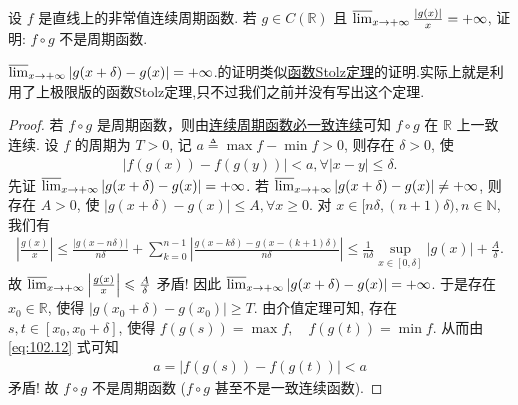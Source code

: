 \documentclass[../../main.tex]{subfiles}
\begin{document}
\begin{example}
设 $f$ 是直线上的非常值连续周期函数. 若 $g \in C(\mathbb{R})$ 且 $\varlimsup_{x \to +\infty} \frac{|g(x)|}{x} = +\infty$, 证明: $f \circ g$ 不是周期函数.
\end{example}
\begin{note}
$\varlimsup_{x \to +\infty} |g(x + \delta) - g(x)| = +\infty$.的证明类似\hyperref[theorem:函数Stolz定理]{函数Stolz定理}的证明.实际上就是利用了上极限版的函数Stolz定理,只不过我们之前并没有写出这个定理.
\end{note}
\begin{proof}
若 $f \circ g$ 是周期函数，则由\hyperref[proposition:连续周期函数必一致连续]{连续周期函数必一致连续}可知 $f \circ g$ 在 $\mathbb{R}$ 上一致连续.
设 $f$ 的周期为 $T > 0$, 记 $a \triangleq \max f - \min f > 0$, 则存在 $\delta > 0$, 使
\begin{align}
|f(g(x)) - f(g(y))| < a, \forall |x - y| \leqslant \delta. \label{eq:102.12}
\end{align}
先证 $\varlimsup_{x \to +\infty} |g(x + \delta) - g(x)| = +\infty$. 若 $\varlimsup_{x \to +\infty} |g(x + \delta) - g(x)| \ne +\infty$, 则存在 $A > 0$, 使
$|g(x + \delta) - g(x)| \leqslant A, \forall x \geqslant 0.$
对 $x \in [n\delta, (n + 1)\delta), n \in \mathbb{N}$, 我们有
\begin{align*}
\left| \frac{g(x)}{x} \right| \leqslant \frac{|g(x - n\delta)|}{n\delta} + \sum_{k=0}^{n - 1} \left| \frac{g(x - k\delta) - g(x - (k + 1)\delta)}{n\delta} \right| \leqslant \frac{1}{n\delta} \sup_{x \in [0, \delta]} |g(x)| + \frac{A}{\delta}.
\end{align*}
故 $\varlimsup_{x \to +\infty} \left| \frac{g(x)}{x} \right| \leqslant \frac{A}{\delta}$ 矛盾! 因此 $\varlimsup_{x \to +\infty} |g(x + \delta) - g(x)| = +\infty$.
于是存在 $x_0 \in \mathbb{R}$, 使得 $|g(x_0 + \delta) - g(x_0)| \geqslant T$. 由介值定理可知, 存在 $s, t \in [x_0, x_0 + \delta]$, 使得
$f(g(s)) = \max f, \quad f(g(t)) = \min f.$
从而由 \eqref{eq:102.12} 式可知
\begin{align*}
a = |f(g(s)) - f(g(t))| < a
\end{align*}
矛盾! 故 $f \circ g$ 不是周期函数 ($f \circ g$ 甚至不是一致连续函数).

\end{proof}
\end{document}
